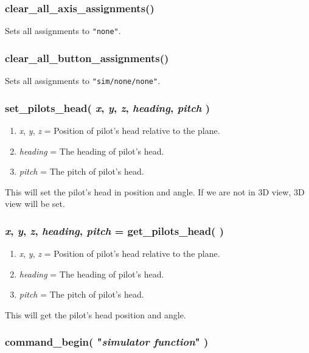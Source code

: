 \documentclass[11pt,parskip=half,a4paper]{scrartcl}
\begin{document}
\subsubsection{clear\_all\_axis\_assignments()}

Sets all assignments to \verb|"none"|.

\subsubsection{clear\_all\_button\_assignments()}

Sets all assignments to \verb|"sim/none/none"|.

\subsubsection{set\_pilots\_head( \emph{x}, \emph{y}, \emph{z}, \emph{heading}, \emph{pitch} )}

\begin{enumerate}
	\item \emph{x}, \emph{y}, \emph{z} = Position of pilot's head relative to the plane.
	\item \emph{heading} = The heading of pilot's head.
	\item \emph{pitch} = The pitch of pilot's head.
\end{enumerate}

This will set the pilot's head in position and angle. If we are not in 3D view, 3D view will be set.

\subsubsection{\emph{x}, \emph{y}, \emph{z}, \emph{heading}, \emph{pitch} = get\_pilots\_head(  )}

\begin{enumerate}
	\item \emph{x}, \emph{y}, \emph{z} = Position of pilot's head relative to the plane.
	\item \emph{heading} = The heading of pilot's head.
	\item \emph{pitch} = The pitch of pilot's head.
\end{enumerate}

This will get the pilot's head position and angle.

\subsubsection{command\_begin( "\emph{simulator function}" )}
\end{document}
